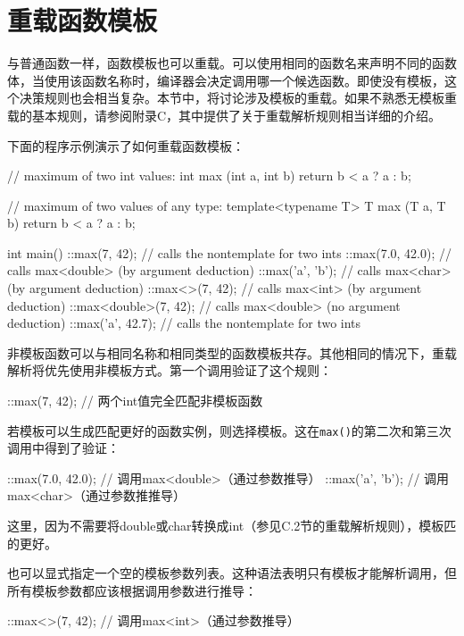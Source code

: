 \section{重载函数模板}

与普通函数一样，函数模板也可以重载。可以使用相同的函数名来声明不同的函数体，当使用该函数名称时，编译器会决定调用哪一个候选函数。即使没有模板，这个决策规则也会相当复杂。本节中，将讨论涉及模板的重载。如果不熟悉无模板重载的基本规则，请参阅附录C，其中提供了关于重载解析规则相当详细的介绍。

下面的程序示例演示了如何重载函数模板：

\begin{cpp}
// maximum of two int values:
int max (int a, int b) {
	return b < a ? a : b;
}

// maximum of two values of any type:
template<typename T>
T max (T a, T b) {
	return b < a ? a : b;
}

int main() {
	::max(7, 42); // calls the nontemplate for two ints
	::max(7.0, 42.0); // calls max<double> (by argument deduction)
	::max('a', 'b'); // calls max<char> (by argument deduction)
	::max<>(7, 42); // calls max<int> (by argument deduction)
	::max<double>(7, 42); // calls max<double> (no argument deduction)
	::max('a', 42.7); // calls the nontemplate for two ints
}
\end{cpp}

非模板函数可以与相同名称和相同类型的函数模板共存。其他相同的情况下，重载解析将优先使用非模板方式。第一个调用验证了这个规则：

\begin{cpp}
::max(7, 42); // 两个int值完全匹配非模板函数
\end{cpp}

若模板可以生成匹配更好的函数实例，则选择模板。这在\texttt{max()}的第二次和第三次调用中得到了验证：

\begin{cpp}
::max(7.0, 42.0); // 调用max<double>（通过参数推导）
::max('a', 'b'); // 调用max<char>（通过参数推推导）
\end{cpp}

这里，因为不需要将double或char转换成int（参见C.2节的重载解析规则），模板匹的更好。

也可以显式指定一个空的模板参数列表。这种语法表明只有模板才能解析调用，但所有模板参数都应该根据调用参数进行推导：

\begin{cpp}
::max<>(7, 42); // 调用max<int>（通过参数推导）
\end{cpp}

